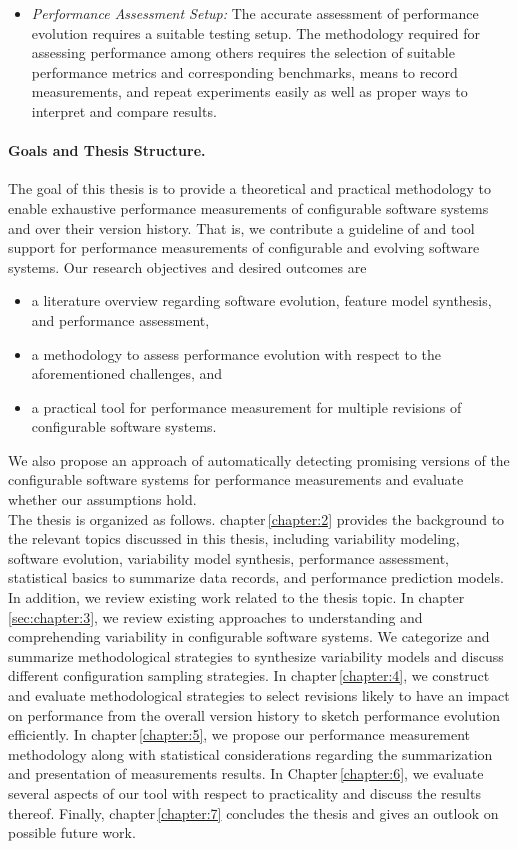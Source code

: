 \begin{itemize}
\item \emph{Performance Assessment Setup:} The accurate assessment of
performance evolution requires a suitable testing setup. The methodology required for assessing performance
among others requires the selection of suitable performance metrics and
corresponding benchmarks, means to record measurements, and repeat experiments
easily as well as proper ways to interpret and compare results.
\end{itemize}

\paragraph{Goals and Thesis Structure.}
The goal of this thesis is to provide a theoretical and practical methodology to enable
exhaustive performance measurements of configurable software systems and over
their version history. That is, we contribute a guideline of and tool support
for performance measurements of configurable and evolving software systems. Our
research objectives and desired outcomes are

\begin{itemize}
\item a literature overview regarding software evolution, feature model
synthesis, and performance assessment,
\item a methodology to assess performance evolution with respect to the
aforementioned challenges, and
\item a practical tool for performance measurement for multiple revisions of
configurable software systems.
\end{itemize}

We also propose an approach of automatically detecting promising versions of the
configurable software systems for performance measurements and evaluate whether
our assumptions hold. \\

The thesis is organized as follows. chapter\,\ref{chapter:2} provides the background
to the relevant topics discussed in this thesis, including variability modeling,
software evolution, variability model synthesis, performance assessment,
statistical basics to summarize data records, and performance prediction
models. In addition, we review existing work related to the thesis topic.
In chapter\,\ref{sec:chapter:3}, we review existing approaches to understanding and
comprehending variability in configurable software systems. We categorize and
summarize methodological strategies to synthesize variability models and
discuss different configuration sampling strategies.
In chapter\,\ref{chapter:4}, we construct and evaluate methodological strategies to
select revisions likely to have an impact on performance from the overall
version history to sketch performance evolution efficiently.
In chapter\,\ref{chapter:5}, we propose our performance measurement methodology along
with statistical considerations regarding the summarization and presentation of
measurements results.
In Chapter\,\ref{chapter:6}, we evaluate several aspects of our tool with respect to
practicality and discuss the results thereof. 
Finally, chapter\,\ref{chapter:7} concludes the thesis and gives an outlook on
possible future work.

